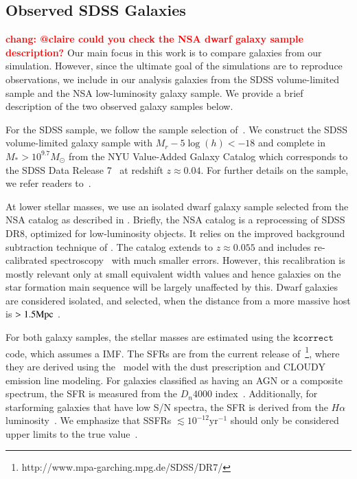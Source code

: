 \documentclass[preprint2,tighten]{aastex62}
\newcommand{\todo}[1]{{\bf \textcolor{red}{ #1}}}
\begin{document}
\subsection{Observed SDSS Galaxies} \label{sec:obvs}
\todo{chang: @claire could you check the NSA dwarf galaxy sample description?}
Our main focus in this work is to compare galaxies from our simulation. 
However, since the ultimate goal of the simulations are to reproduce 
observations, we include in our analysis galaxies from the 
SDSS volume-limited sample and the NSA low-luminosity galaxy sample. 
We provide a brief description of the two observed galaxy samples 
below. 

For the SDSS sample, we follow the sample selection of~\cite{tinker2011}. 
We construct the SDSS volume-limited galaxy sample with $M_r - 5\log(h) < -18$ 
and complete in $M_* > 10^{9.7} M_\odot$ from the NYU Value-Added 
Galaxy Catalog \citep[VAGC;][]{blanton2005} which corresponds to 
the SDSS Data Release 7~\citep[DR7;][]{abazajian2009} at redshift 
$z \approx 0.04$. For further details on the sample, we refer readers 
to~\cite{tinker2011,wetzel2013,hahn2017}.

At lower stellar masses, we use an isolated dwarf galaxy sample selected from the NSA catalog as described in \citet{geha2012}. Briefly, the NSA catalog is a reprocessing of SDSS DR8, optimized for low-luminosity 
objects. It relies on the improved background subtraction technique of 
\cite{blanton2011}. The catalog extends to $z \approx 0.055$ and includes 
re-calibrated spectroscopy~\citep{yan2011,yan2012} with much
smaller errors. However, this recalibration is mostly relevant only at small 
equivalent width values and hence galaxies on the star formation main 
sequence will be largely unaffected by this. Dwarf galaxies are considered isolated, and selected, when the distance from a more massive host is $> 1.5 {\rm Mpc}$ \citep{geha2012}.

For both galaxy samples, the stellar masses are estimated using the 
\citet{blanton2007} $\mathtt{kcorrect}$ code, which assumes a 
\cite{chabrier2003} IMF. The SFRs are from the current release 
of~\citet{brinchmann2004}\footnote{http://www.mpa-garching.mpg.de/SDSS/DR7/}, 
where they are derived using the~\cite{bruzuala.1993} model with the 
\cite{charlot2000} dust prescription and CLOUDY \citep[version C90.04;][]{ferland1996} emission line modeling.  
For galaxies classified as having an AGN or a composite spectrum, the 
SFR is measured from the $D_n4000$ index~\citep{balogh1998}. 
Additionally, for starforming galaxies that have low S/N spectra, the SFR 
is derived from the $H{\alpha}$ luminosity~\citep{brinchmann2004}. 
We emphasize that SSFRs $\lesssim 10^{-12} \mathrm{yr}^{-1}$ should only be 
considered upper limits to the true value~\citep{salim2007}.
\end{document}
